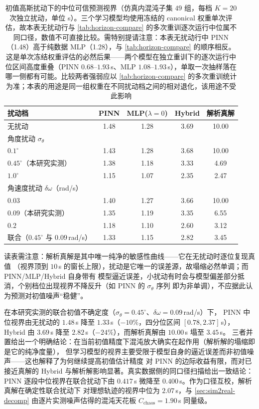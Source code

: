 \documentclass[a4paper,12pt]{ctexart}   %
\renewcommand{\emph}[1]{#1}
\begin{document}
\begin{table}[h]
\centering
\caption{初值高斯扰动下的中位可信预测视界（仿真内混沌子集 $49$ 组，每档 $K=20$ 次独立扰动，单位 s）。三个学习模型均使用冻结的 canonical 权重单次评估，故本表无扰动行与 \cref{tab:horizon-compare} 的多次重训逐次运行中位属不同口径，数值不可直接比较。需特别提请注意：本表无扰动行中 PINN（1.48）高于纯数据 MLP（1.28），与 \cref{tab:horizon-compare} 的顺序相反。这是单次冻结权重评估的必然后果——两个模型在独立重训下的逐次运行中位区间高度重叠（PINN $0.68$--$1.93$\,s、MLP $1.08$--$1.93$\,s），单取一次抽样落在哪一侧都有可能。比较两者强弱应以 \cref{tab:horizon-compare} 的多次重训统计为准；本表的用途是同一组权重在不同扰动档之间的\emph{相对}退化，该用途不受此影响}
\label{tab:sensitivity}
\begin{tabular}{lcccc}
\toprule
扰动档 & PINN & MLP($\lambda{=}0$) & Hybrid & 解析真解 \\
\midrule
无扰动 & 1.48 & 1.28 & 3.69 & 10.00 \\
\midrule
\multicolumn{5}{l}{\emph{角度扰动} $\sigma_\theta$} \\
\quad $0.1^\circ$ & 1.43 & 1.28 & 3.68 & 10.00 \\
\quad $0.45^\circ$（本研究实测） & 1.38 & 1.18 & 3.33 & 4.69 \\
\quad $1.0^\circ$ & 1.15 & 1.07 & 2.35 & 2.47 \\
\midrule
\multicolumn{5}{l}{\emph{角速度扰动} $\delta\omega$（rad/s）} \\
\quad $0.03$ & 1.40 & 1.27 & 3.66 & 10.00 \\
\quad $0.09$（本研究实测） & 1.35 & 1.19 & 3.35 & 6.55 \\
\quad $0.2$ & 1.18 & 1.10 & 2.60 & 3.12 \\
\midrule
联合（$0.45^\circ$ 与 $0.09$\,rad/s） & 1.33 & 1.15 & 2.82 & 3.45 \\
\bottomrule
\end{tabular}
\end{table}

\noindent 读表需注意：解析真解是其中唯一\emph{纯净}的敏感性曲线——它在无扰动时逐位复现真值
（视界顶到 $10$\,s 的窗长上限），扰动是它唯一的误差源，故塌缩必然单调；而 PINN/MLP/Hybrid 自身带有
模型逼近误差，小扰动有时会与模型偏差部分抵消，个别档位出现视界不降反升（如 PINN 的 $\sigma_\theta$ 序列
即为非单调），不应据此认为预测对初值噪声“稳健”。

在本研究实测的联合初值不确定度（$\sigma_\theta = 0.45^\circ$、$\delta\omega = 0.09$\,rad/s）下，
PINN 中位视界由无扰动的 $1.48$\,s 降至 $1.33$\,s（$-10\%$，四分位区间 $[0.78, 2.37]$\,s），
Hybrid 由 $3.69$\,s 降至 $2.82$\,s（$-24\%$），而解析真解由 $10.00$\,s 塌至 $3.45$\,s。
三者并置给出一个明确结论：在当前初值精度下混沌放大确实在起作用（解析解的塌缩即是它的纯净度量），
但学习模型的视界主要受限于模型自身的逼近误差而非初值噪声——这也解释了为何继续提高初值估计精度
对 PINN 的边际收益有限，而对已接近真解的 Hybrid 与解析解影响显著。真实数据侧的同口径扫描给出一致结论：
PINN 逐段中位视界在联合扰动下由 $0.417$\,s 微降至 $0.400$\,s。作为口径互校，解析真解在确定性联合扰动下
对理想轨迹的视界中位为 $2.07$\,s，与 \cref{sec:sim2real-decomp} 由逐片实测噪声估得的混沌天花板
$C_{\mathrm{chaos}} = 1.90$\,s 同量级。
\end{document}
